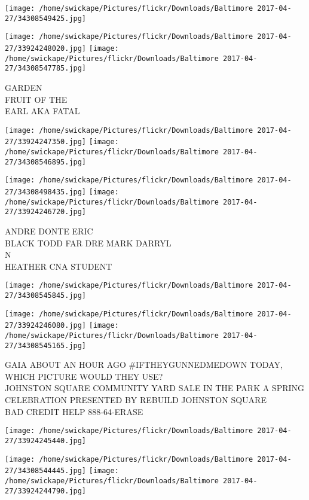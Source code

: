 \documentclass[10pt,letterpaper]{article}
\begin{document}
\texttt{[image: /home/swickape/Pictures/flickr/Downloads/Baltimore 2017-04-27/34308549425.jpg]}

\vspace{0.25in}
\texttt{[image: /home/swickape/Pictures/flickr/Downloads/Baltimore 2017-04-27/33924248020.jpg]}
\texttt{[image: /home/swickape/Pictures/flickr/Downloads/Baltimore 2017-04-27/34308547785.jpg]}

GARDEN\\
FRUIT OF THE\\
EARL AKA FATAL
\pagebreak

\texttt{[image: /home/swickape/Pictures/flickr/Downloads/Baltimore 2017-04-27/33924247350.jpg]}
\texttt{[image: /home/swickape/Pictures/flickr/Downloads/Baltimore 2017-04-27/34308546895.jpg]}

\texttt{[image: /home/swickape/Pictures/flickr/Downloads/Baltimore 2017-04-27/34308498435.jpg]}
\texttt{[image: /home/swickape/Pictures/flickr/Downloads/Baltimore 2017-04-27/33924246720.jpg]}

ANDRE DONTE ERIC\\
BLACK TODD FAR DRE MARK DARRYL\\
N\\
HEATHER CNA STUDENT
\pagebreak

\texttt{[image: /home/swickape/Pictures/flickr/Downloads/Baltimore 2017-04-27/34308545845.jpg]}

\vspace{0.25in}
\texttt{[image: /home/swickape/Pictures/flickr/Downloads/Baltimore 2017-04-27/33924246080.jpg]}
\texttt{[image: /home/swickape/Pictures/flickr/Downloads/Baltimore 2017-04-27/34308545165.jpg]}

GAIA ABOUT AN HOUR AGO \#IFTHEYGUNNEDMEDOWN TODAY, WHICH PICTURE WOULD THEY USE?\\
JOHNSTON SQUARE COMMUNITY YARD SALE IN THE PARK A SPRING CELEBRATION PRESENTED BY REBUILD JOHNSTON SQUARE\\
BAD CREDIT HELP 888{-}64{-}ERASE
\pagebreak

\texttt{[image: /home/swickape/Pictures/flickr/Downloads/Baltimore 2017-04-27/33924245440.jpg]}

\vspace{0.25in}
\texttt{[image: /home/swickape/Pictures/flickr/Downloads/Baltimore 2017-04-27/34308544445.jpg]}
\texttt{[image: /home/swickape/Pictures/flickr/Downloads/Baltimore 2017-04-27/33924244790.jpg]}
\end{document}
